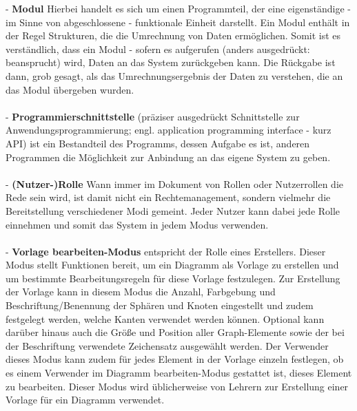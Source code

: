 \documentclass[enabledeprecatedfontcommands,fontsize=11pt,paper=a4,twoside]{scrartcl}
\newcounter{one}
\begin{document}
	- \textbf{Modul} Hierbei handelt es sich um einen Programmteil, der eine eigenständige - im Sinne von abgeschlossene - funktionale Einheit darstellt. Ein Modul enthält in der Regel Strukturen, die die Umrechnung von Daten ermöglichen. Somit ist es verständlich, dass ein Modul - sofern es aufgerufen (anders ausgedrückt: beansprucht) wird, Daten an das System zurückgeben kann. Die Rückgabe ist dann, grob gesagt, als das Umrechnungsergebnis der Daten zu verstehen, die an das Modul übergeben wurden. \\ \\
	- \textbf{Programmierschnittstelle} (präziser ausgedrückt Schnittstelle zur Anwendungsprogrammierung; engl. application programming interface - kurz API) ist ein Bestandteil des Programms, dessen Aufgabe es ist, anderen Programmen die Möglichkeit zur Anbindung an das eigene System zu geben.\\ \\
	- \textbf{(Nutzer-)Rolle} Wann immer im Dokument von Rollen oder Nutzerrollen die Rede sein wird, ist damit nicht ein Rechtemanagement, sondern vielmehr die Bereitstellung verschiedener Modi gemeint. Jeder Nutzer kann dabei jede Rolle einnehmen und somit das System in jedem Modus verwenden. \\ \\
	- \textbf{\hypertarget{``Vorlage bearbeiten''-Modus}{\glqq Vorlage bearbeiten\grqq -Modus}} entspricht der Rolle eines Erstellers. Dieser Modus stellt Funktionen bereit, um ein Diagramm als Vorlage zu erstellen und um bestimmte Bearbeitungsregeln für diese Vorlage festzulegen. Zur Erstellung der Vorlage kann in diesem Modus die Anzahl, Farbgebung und Beschriftung/Benennung der Sphären und Knoten eingestellt und zudem festgelegt werden, welche Kanten verwendet werden können. Optional kann darüber hinaus auch die Größe und Position aller Graph-Elemente sowie der bei der Beschriftung verwendete Zeichensatz ausgewählt werden. Der Verwender dieses Modus kann zudem für jedes Element in der Vorlage einzeln festlegen, ob es einem Verwender im \glqq Diagramm bearbeiten\grqq-Modus gestattet ist, dieses Element zu bearbeiten. Dieser Modus wird üblicherweise von Lehrern zur Erstellung einer Vorlage für ein Diagramm verwendet. \\ \\
\end{document}
